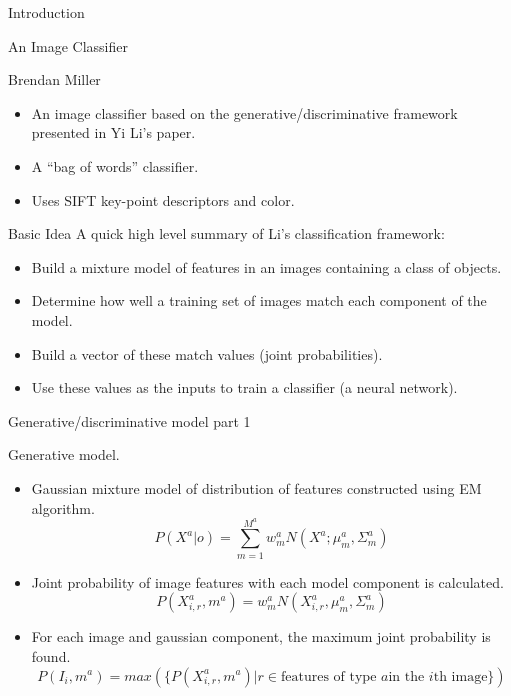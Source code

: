 \documentclass{beamer}
\begin{document}
\begin{frame}{Introduction}
\begin{center}
  An Image Classifier

  Brendan Miller
\end{center}

\begin{itemize}
  \item An image classifier based on the generative/discriminative framework
  presented in Yi Li's paper.
  \item A ``bag of words'' classifier.
  \item Uses SIFT key-point descriptors and color.
\end{itemize}

\end{frame}

\begin{frame}{Basic Idea}
  A quick high level summary of Li's classification framework:
  \begin{itemize}
    \item Build a mixture model of features in an images containing a class of objects.
    \item Determine how well a training set of images match each component of the model.
    \item Build a vector of these match values (joint probabilities).
    \item Use these values as the inputs to train a classifier (a neural network).
  \end{itemize}
\end{frame}

\begin{frame}{Generative/discriminative model part 1}

Generative model.

\begin{itemize}
  \item Gaussian mixture model of distribution of features constructed using EM algorithm.
    \begin{equation*}
      P(X^a|o) = \sum_{m=1}^{M^a} w^a_m N(X^a; \mu^a_m, \Sigma^a_m)
    \end{equation*}
  \item Joint probability of image features with each model component is calculated.
    \begin{equation*}
      P(X^a_{i,r},m^a) = w^a_m N(X^a_{i,r}, \mu^a_m, \Sigma^a_m)
    \end{equation*}
  \item For each image and gaussian component, the maximum joint probability is found.
    \begin{equation*}
      P(I_i, m^a) = max(\{P(X^a_{i,r}, m^a)|r \in \mbox{features of type $a$
        in the $i$th image\}})
    \end{equation*}

\end{itemize}  

\end{frame}
\end{document}
